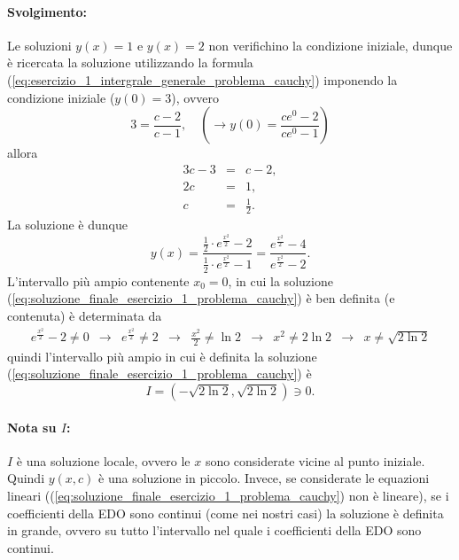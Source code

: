 \begin{example}
    \paragraph{Svolgimento:} Le soluzioni $y(x)=1$ e $y(x)=2$ non verifichino la condizione iniziale, dunque è ricercata la soluzione utilizzando la formula (\ref{eq:esercizio_1_intergrale_generale_problema_cauchy}) imponendo la condizione iniziale ($y(0)=3$), ovvero
    \begin{equation*}
        3=\frac{c-2}{c-1},\quad \left(\rightarrow y(0)=\frac{ce^0-2}{ce^0-1}\right)
    \end{equation*}
    allora
    \begin{equation*}
        \begin{matrix}
            3c - 3 &=& c-2,\\
            2c &=& 1,\\
            c &=&\frac{1}{2}.
        \end{matrix}
    \end{equation*}
    La soluzione è dunque
    \begin{equation}\label{eq:soluzione_finale_esercizio_1_problema_cauchy}
        y(x)=\frac{\frac{1}{2}\cdot e^{\frac{x^2}{2}}-2}{\frac{1}{2}\cdot e^{\frac{x^2}{2}}-1} = \frac{e^{\frac{x^2}{2}}-4}{e^{\frac{x^2}{2}}-2}.
    \end{equation}
    \footnotemark L'intervallo più ampio contenente $x_0=0$, in cui la soluzione (\ref{eq:soluzione_finale_esercizio_1_problema_cauchy}) è ben definita (e contenuta) è determinata da
    \begin{equation*}
        \begin{matrix}
            e^{\frac{x^2}{2}}-2 \neq 0 &\rightarrow& e^{\frac{x^2}{2}}\neq 2 &\rightarrow& \frac{x^2}{2}\neq\ln 2 &\rightarrow& x^2\neq 2\ln2 &\rightarrow& x\neq \sqrt{2\ln2}
        \end{matrix}
    \end{equation*}
    quindi l'intervallo più ampio in cui è definita la soluzione (\ref{eq:soluzione_finale_esercizio_1_problema_cauchy}) è
    \begin{equation*}
        I=(-\sqrt{2\ln2}, \sqrt{2\ln2})\ni 0.
    \end{equation*}
    
    \paragraph{Nota su $I$:} $I$ è una soluzione locale, ovvero le $x$ sono considerate vicine al punto iniziale. Quindi $y(x,c)$ è una soluzione in piccolo. Invece, se considerate le equazioni lineari ((\ref{eq:soluzione_finale_esercizio_1_problema_cauchy}) non è lineare), se i coefficienti della EDO sono continui (come nei nostri casi) la soluzione è definita in grande, ovvero su tutto l'intervallo nel quale i coefficienti della EDO sono continui.
    

\end{example}
